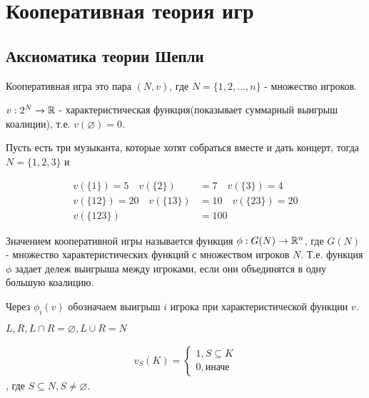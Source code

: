 \documentclass[../main.tex]{subfiles}
\begin{document}
\section{Кооперативная теория игр}

\subsection{Аксиоматика теории Шепли}

\begin{df}
	Кооперативная игра это пара $(N, v)$, где  $N = \{1, 2, \ldots, n\}$ - множество игроков.

	 $v : 2^{N} \to \mathbb{R}$ - характеристическая функция(показывает суммарный выигрыш коалиции), т.е. $v(\varnothing) = 0$.
\end{df}

\begin{exmpl}
	Пусть есть три музыканта, которые хотят собраться вместе и дать концерт, тогда $N = \{1, 2, 3\}$ и 

	\begin{align*}
		v(\{1\}) = 5 \quad v(\{2\}) &= 7 \quad v(\{3\}) = 4 \\
		v(\{12\}) = 20 \quad v(\{13\}) &= 10 \quad v(\{23\}) = 20 \\
		v(\{123\}) &= 100
	\end{align*}

\end{exmpl}

\begin{df}
	Значением кооперативной игры называется функция $\phi : G(N) \to \mathbb{R}^{n}$, где $G(N)$ - множество характеристических функций с множеством игроков  $N$.
	Т.е. функция $\phi$ задает дележ выигрыша между игроками, если они объединятся в одну большую коалицию.

	Через $\phi_i(v)$ обозначаем выигрыш  $i$ игрока при характеристической функции $v$.
\end{df}

\begin{exmpl}[Парам]
	$L, R, L \cap R = \varnothing, L \cup R = N$ 

\end{exmpl}

\begin{df} \label{definition:unaminity_game}
	\begin{align*}
		v_S(K) = \begin{cases}
			1, S \subseteq K \\
			0, \text{иначе}
		\end{cases}
	\end{align*},
	где $S \subseteq N, S \neq \varnothing$.
\end{df}
\end{document}
